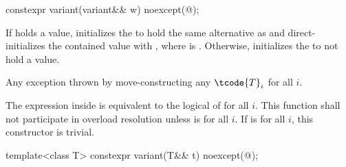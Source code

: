 %
\begin{itemdecl}
constexpr variant(variant&& w) noexcept(@\seebelow@);
\end{itemdecl}

\begin{itemdescr}
\pnum
\effects
If  holds a value, initializes the  to hold the same
alternative as  and direct-initializes the contained value with
, where  is .
Otherwise, initializes the  to not hold a value.

\pnum
\throws
Any exception thrown by move-constructing any $\tcode{T}_i$ for all $i$.

\pnum
\remarks
The expression inside  is equivalent to the logical  of
 for all $i$.
This function shall not participate in overload resolution unless
 is  for all $i$.
If 
is  for all $i$, this constructor is trivial.
\end{itemdescr}

%
\begin{itemdecl}
template<class T> constexpr variant(T&& t) noexcept(@\seebelow@);
\end{itemdecl}

